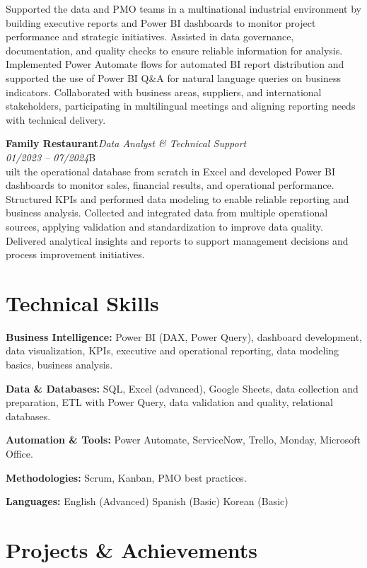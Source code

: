 \documentclass[11pt,a4paper]{article}
\newcommand{\cvrole}[4]{%
  \vspace{4pt}%
  {\bfseries\color{accentcolor}#1}\hfill{\itshape #2}\\[-2pt]%
  {\itshape #3}\hfill #4\\[6pt]%
}
\begin{document}
Supported the data and PMO teams in a multinational industrial environment by building executive reports and Power BI dashboards to monitor project performance and strategic initiatives. Assisted in data governance, documentation, and quality checks to ensure reliable information for analysis. Implemented Power Automate flows for automated BI report distribution and supported the use of Power BI Q\&A for natural language queries on business indicators. Collaborated with business areas, suppliers, and international stakeholders, participating in multilingual meetings and aligning reporting needs with technical delivery.

\cvrole{Family Restaurant}{Data Analyst \& Technical Support}{01/2023 -- 07/2024}

Built the operational database from scratch in Excel and developed Power BI dashboards to monitor sales, financial results, and operational performance. Structured KPIs and performed data modeling to enable reliable reporting and business analysis. Collected and integrated data from multiple operational sources, applying validation and standardization to improve data quality. Delivered analytical insights and reports to support management decisions and process improvement initiatives.

\section{Technical Skills}

\textbf{Business Intelligence:} Power BI (DAX, Power Query), dashboard development, data visualization, KPIs, executive and operational reporting, data modeling basics, business analysis.

\textbf{Data \& Databases:} SQL, Excel (advanced), Google Sheets, data collection and preparation, ETL with Power Query, data validation and quality, relational databases.

\textbf{Automation \& Tools:} Power Automate, ServiceNow, Trello, Monday, Microsoft Office.

\textbf{Methodologies:} Scrum, Kanban, PMO best practices.

\textbf{Languages:} English (Advanced) \enspace\textbullet\enspace Spanish (Basic) \enspace\textbullet\enspace Korean (Basic)

\section{Projects \& Achievements}
\end{document}
